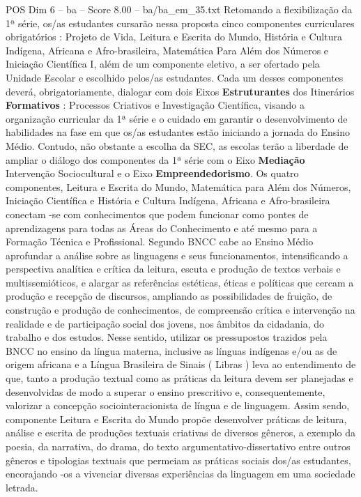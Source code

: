 \begin{textsample}{POS Dim 6 – ba – Score 8.00 – ba/ba\_em\_35.txt}
Retomando a flexibilização da 1ª série, os/as estudantes cursarão nessa proposta cinco componentes curriculares obrigatórios : Projeto de Vida, Leitura e Escrita do Mundo, História e Cultura Indígena, Africana e Afro-brasileira, Matemática Para Além dos Números e Iniciação Científica I, além de um componente eletivo, a ser ofertado pela Unidade Escolar e escolhido pelos/as estudantes.
Cada um desses componentes deverá, obrigatoriamente, dialogar com dois Eixos \textbf{Estruturantes} dos Itinerários \textbf{Formativos} : Processos Criativos e Investigação Científica, visando a organização curricular da 1ª série e o cuidado em garantir o desenvolvimento de habilidades na fase em que os/as estudantes estão iniciando a jornada do Ensino Médio.
Contudo, não obstante a escolha da SEC, as escolas terão a liberdade de ampliar o diálogo dos componentes da 1ª série com o Eixo \textbf{Mediação} Intervenção Sociocultural e o Eixo \textbf{Empreendedorismo}.
Os quatro componentes, Leitura e Escrita do Mundo, Matemática para Além dos Números, Iniciação Científica e História e Cultura Indígena, Africana e Afro-brasileira conectam -se com conhecimentos que podem funcionar como pontes de aprendizagens para todas as Áreas do Conhecimento e até mesmo para a Formação Técnica e Profissional.
Segundo BNCC cabe ao Ensino Médio aprofundar a análise sobre as linguagens e seus funcionamentos, intensificando a perspectiva analítica e crítica da leitura, escuta e produção de textos verbais e multissemióticos, e alargar as referências estéticas, éticas e políticas que cercam a produção e recepção de discursos, ampliando as possibilidades de fruição, de construção e produção de conhecimentos, de compreensão crítica e intervenção na realidade e de participação social dos jovens, nos âmbitos da cidadania, do trabalho e dos estudos.
Nesse sentido, utilizar os pressupostos trazidos pela BNCC no ensino da língua materna, inclusive as línguas indígenas e/ou as de origem africana e a Língua Brasileira de Sinais ( Libras ) leva ao entendimento de que, tanto a produção textual como as práticas da leitura devem ser planejadas e desenvolvidas de modo a superar o ensino prescritivo e, consequentemente, valorizar a concepção sociointeracionista de língua e de linguagem.
Assim sendo, componente Leitura e Escrita do Mundo propõe desenvolver práticas de leitura, análise e escrita de produções textuais criativas de diversos gêneros, a exemplo da poesia, da narrativa, do drama, do texto argumentativo-dissertativo entre outros gêneros e tipologias textuais que permeiam as práticas sociais dos/as estudantes, encorajando -os a vivenciar diversas experiências da linguagem em uma sociedade letrada.

\end{textsample}
